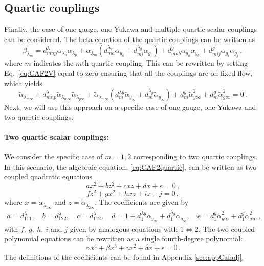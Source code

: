 \subsection{Quartic couplings }Finally, the case of one gauge, one Yukawa and multiple quartic scalar couplings can be considered. The beta equation of the quartic couplings can be written as
\begin{equation}
    \beta_{{\lambda_m}} = d^{\lambda}_{mnp} \alpha_{\lambda_n} \alpha_{\lambda_p} + \alpha_{\lambda_m} \left( d^{\lambda_y}_{ma} \alpha_{y_a} + d^{\lambda_g}_{mi} \alpha_{g_i} \right) + d^{y}_{mab} \alpha_{y_a} \alpha_{y_b}+ d^{g}_{mij} \alpha_{g_i} \alpha_{g_j}\,,\label{eq:multquartic}
\end{equation}
where $m$ indicates the $m$th quartic coupling. This can be rewritten by setting Eq.~\eqref{eq:CAF2V} equal to zero ensuring that all the couplings are on fixed flow, which yields
\begin{equation}
    \tilde\alpha_{\lambda _{m\infty}} + d^{\lambda}_{mnp}\tilde\alpha_{\lambda _{m\infty}}\tilde\alpha_{\lambda _{p\infty}}+ \tilde\alpha_{\lambda _{m\infty}}(d^{\lambda y}_m \tilde\alpha_{y _{\infty}} +d^{\lambda_g}_m\tilde\alpha_{y _{\infty}}) + d^{y}_m\tilde\alpha_{y\infty}^2+ d^{g}_m \tilde\alpha_{g\infty}^2 = 0    \,.\label{eq:CAF2quartic}
\end{equation}
Next, we will use this approach on a specific case of one gauge, one Yukawa and two quartic couplings.

\paragraph{Two quartic scalar couplings: } We consider the specific case of $m=1,2$ corresponding to two quartic couplings. In this scenario, the algebraic equation, \eqref{eq:CAF2quartic}, can be written as two coupled quadratic equations
\begin{equation}
    a  {x}^2 + b  {z}^2 + c  {x}{z} + d  {x} + e = 0\,,\label{eq:CAF2poly1}
\end{equation}
\begin{equation}
    f  {z}^2 + g  {x}^2 + h  {x}{z} + i  {z} + j = 0\,,\label{eq:CAF2poly2}
\end{equation}
where $x=\tilde\alpha_{\lambda_{1\infty}}$ and $z=\tilde\alpha_{\lambda_{2\infty}}$. The coefficients are given by
\begin{align}
    a=d^{\lambda}_{111},\quad b=d^{\lambda}_{122},\quad c=d^{\lambda}_{112},\quad d=1+d^{\lambda y}_1 \tilde\alpha_{y _{\infty}} +d^{\lambda_g}_1\tilde\alpha_{g _{\infty}},\quad e=d^{y}_1\tilde\alpha_{y\infty}^2+ d^{g}_1 \tilde\alpha_{g\infty}^2\,,\label{eq:coef2quartic}
\end{align}
with $f,\ g,\ h,\ i$ and $j$ given by analogous equations with $1\Leftrightarrow 2$. The two coupled polynomial equations can be rewritten as a single fourth-degree polynomial:
\begin{equation}
    \alpha x^4+ \beta x^3 +\gamma x^2 +\delta x+\epsilon=0\,.\label{eq:fourthdegpoly}
\end{equation}
The definitions of the coefficients can be found in Appendix \ref{sec:appCafadj}. 

